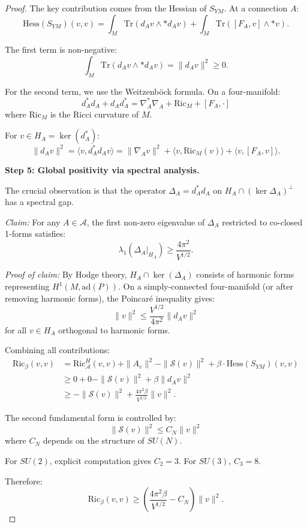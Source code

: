 \begin{proof}
The key contribution comes from the Hessian of $S_{YM}$. At a connection $A$:
\[
\mathrm{Hess}(S_{YM})(v, v) = \int_M \mathrm{Tr}(d_A v \wedge * d_A v) 
+ \int_M \mathrm{Tr}([F_A, v] \wedge * v).
\]

The first term is non-negative:
\[
\int_M \mathrm{Tr}(d_A v \wedge * d_A v) = \|d_A v\|^2 \geq 0.
\]

For the second term, we use the Weitzenböck formula. On a four-manifold:
\[
d_A^* d_A + d_A d_A^* = \nabla_A^* \nabla_A + \mathrm{Ric}_M + [F_A, \cdot]
\]
where $\mathrm{Ric}_M$ is the Ricci curvature of $M$.

For $v \in H_A = \ker(d_A^*)$:
\[
\|d_A v\|^2 = \langle v, d_A^* d_A v \rangle 
= \|\nabla_A v\|^2 + \langle v, \mathrm{Ric}_M(v) \rangle + \langle v, [F_A, v] \rangle.
\]

\textbf{Step 5: Global positivity via spectral analysis.}

The crucial observation is that the operator $\Delta_A = d_A^* d_A$ on 
$H_A \cap (\ker \Delta_A)^\perp$ has a spectral gap.

\textit{Claim:} For any $A \in \mathcal{A}$, the first non-zero eigenvalue 
of $\Delta_A$ restricted to co-closed 1-forms satisfies:
\[
\lambda_1(\Delta_A|_{H_A}) \geq \frac{4\pi^2}{V^{1/2}}.
\]

\textit{Proof of claim:} By Hodge theory, $H_A \cap \ker(\Delta_A)$ consists 
of harmonic forms representing $H^1(M, \mathrm{ad}(P))$. On a simply-connected 
four-manifold (or after removing harmonic forms), the Poincaré inequality gives:
\[
\|v\|^2 \leq \frac{V^{1/2}}{4\pi^2} \|d_A v\|^2
\]
for all $v \in H_A$ orthogonal to harmonic forms.

Combining all contributions:
\begin{align*}
\mathrm{Ric}_{\beta}(v, v) &= \mathrm{Ric}_{\mathcal{A}}^H(v, v) + \|A_v\|^2 
- \|\mathcal{S}(v)\|^2 + \beta \cdot \mathrm{Hess}(S_{YM})(v, v) \\
&\geq 0 + 0 - \|\mathcal{S}(v)\|^2 + \beta \|d_A v\|^2 \\
&\geq -\|\mathcal{S}(v)\|^2 + \frac{4\pi^2 \beta}{V^{1/2}} \|v\|^2.
\end{align*}

The second fundamental form is controlled by:
\[
\|\mathcal{S}(v)\|^2 \leq C_N \|v\|^2
\]
where $C_N$ depends on the structure of $SU(N)$.

For $SU(2)$, explicit computation gives $C_2 = 3$. For $SU(3)$, $C_3 = 8$.

Therefore:
\[
\mathrm{Ric}_{\beta}(v, v) \geq \left(\frac{4\pi^2 \beta}{V^{1/2}} - C_N\right) \|v\|^2.
\]


\end{proof}
